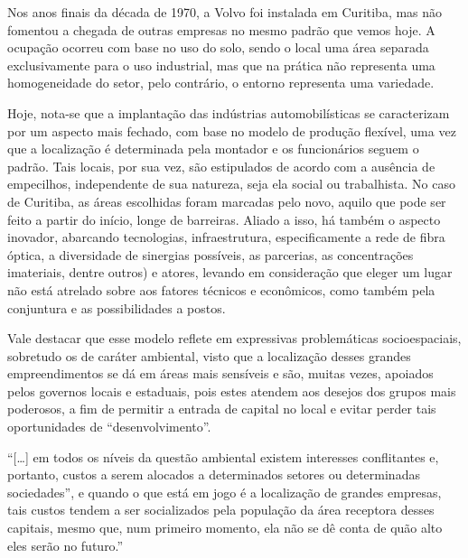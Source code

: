 	Nos anos finais da década de 1970, a Volvo foi instalada em Curitiba, mas não fomentou a chegada de outras empresas no mesmo padrão que vemos hoje. A ocupação ocorreu com base no uso do solo, sendo o local uma área separada exclusivamente para o uso industrial, mas que na prática não representa uma homogeneidade do setor, pelo contrário, o entorno representa uma variedade.
	
	Hoje, nota-se que a implantação das indústrias automobilísticas se caracterizam por um aspecto mais fechado, com base no modelo de produção flexível, uma vez que a localização é determinada pela montador e os funcionários seguem o padrão. Tais locais, por sua vez, são estipulados de acordo com a ausência de empecilhos, independente de sua natureza, seja ela social ou trabalhista. No caso de Curitiba, as áreas escolhidas foram marcadas pelo novo, aquilo que pode ser feito a partir do início, longe de barreiras. Aliado a isso, há também o aspecto inovador, abarcando tecnologias, infraestrutura, especificamente a rede de fibra óptica, a diversidade de sinergias possíveis, as parcerias, as concentrações imateriais, dentre outros) e atores, levando em consideração que eleger um lugar não está atrelado sobre aos fatores técnicos e econômicos, como também pela conjuntura e as possibilidades a postos.

	Vale destacar que esse modelo reflete em expressivas problemáticas socioespaciais, sobretudo os de caráter ambiental, visto que a localização desses grandes empreendimentos se dá em áreas mais sensíveis e são, muitas vezes, apoiados pelos governos locais e estaduais, pois estes atendem aos desejos dos grupos mais poderosos, a fim de permitir a entrada de capital no local e evitar perder tais oportunidades de ``desenvolvimento''. 
	
	\begin{citacao}
		``[\dots] em todos os níveis da questão ambiental existem interesses conflitantes e, portanto, custos a serem alocados a determinados setores ou determinadas sociedades”, e quando o que está em jogo é a localização de grandes empresas, tais custos tendem a ser socializados pela população da área receptora desses capitais, mesmo que, num primeiro momento, ela não se dê conta de quão alto eles serão no futuro.'' 
	\end{citacao}

